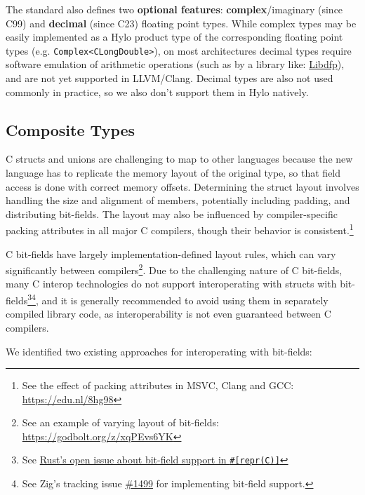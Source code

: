 The standard also defines two \textbf{optional features}: \textbf{complex}/imaginary (since C99) and \textbf{decimal} (since C23) floating point types. While complex types may be easily implemented as a Hylo product type of the corresponding floating point types (e.g. \texttt{Complex<CLongDouble>}), on most architectures decimal types require software emulation of arithmetic operations (such as by a library like: \href{https://github.com/libdfp/libdfp}{Libdfp}), and are not yet supported in LLVM/Clang\cite{no-support-llvm-decimals}. Decimal types are also not used commonly in practice, so we also don't support them in Hylo natively.

\subsection{Composite Types}

C structs and unions are challenging to map to other languages because the new language has to replicate the memory layout of the original type, so that field access is done with correct memory offsets. Determining the struct layout involves handling the size and alignment of members, potentially including padding, and distributing bit-fields. The layout may also be influenced by compiler-specific packing attributes in all major C compilers, though their behavior is consistent.\footnote{See the effect of packing attributes in MSVC, Clang and GCC: \url{https://edu.nl/8hg98}}

C bit-fields have largely implementation-defined layout rules, which can vary significantly between compilers\footnote{See an example of varying layout of bit-fields: \url{https://godbolt.org/z/xqPEvs6YK}}. Due to the challenging nature of C bit-fields, many C interop technologies do not support interoperating with structs with bit-fields\footnote{See \href{https://github.com/rust-lang/rfcs/issues/314}{Rust's open issue about bit-field support in \texttt{\#[repr(C)]}}}\footnote{See Zig's tracking issue \href{https://github.com/ziglang/zig/issues/1499}{\#1499} for implementing bit-field support.}, and it is generally recommended to avoid using them in separately compiled library code, as interoperability is not even guaranteed between C compilers.

We identified two existing approaches for interoperating with bit-fields:

